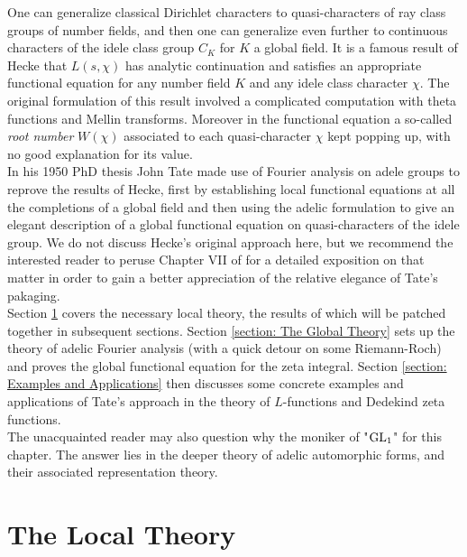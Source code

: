 \documentclass[11pt, x11names, openany]{book}
\begin{document}
One can generalize classical Dirichlet characters to quasi-characters of ray class groups of number fields, and then one can generalize even further to continuous characters of the idele class group $C_K$ for $K$ a global field. It is a famous result of Hecke that $L(s, \chi)$ has analytic continuation and satisfies an appropriate functional equation for any number field $K$ and any idele class character $\chi$. The original formulation of this result involved a complicated computation with theta functions and Mellin transforms. Moreover in the functional equation a so-called \textit{root number} $W(\chi)$ associated to each quasi-character $\chi$ kept popping up, with no good explanation for its value.\\

In his 1950 PhD thesis John Tate made use of Fourier analysis on adele groups to reprove the results of Hecke, first by establishing local functional equations at all the completions of a global field and then using the adelic formulation to give an elegant description of a global functional equation on quasi-characters of the idele group. We do not discuss Hecke's original approach here, but we recommend the interested reader to peruse Chapter VII of \cite{neukirch2010algebraic} for a detailed exposition on that matter in order to gain a better appreciation of the relative elegance of Tate's pakaging.\\

Section \ref{section: Local Theory} covers the necessary local theory, the results of which will be patched together in subsequent sections. Section \ref{section: The Global Theory} sets up the theory of adelic Fourier analysis (with a quick detour on some Riemann-Roch) and proves the global functional equation for the zeta integral. Section \ref{section: Examples and Applications} then discusses some concrete examples and applications of Tate's approach in the theory of $L$-functions and Dedekind zeta functions.\\

The unacquainted reader may also question why the moniker of "$\operatorname{GL}_1$" for this chapter. The answer lies in the deeper theory of adelic automorphic forms, and their associated representation theory.


\newpage
\section{The Local Theory}
\label{section: Local Theory}
 
\end{document}
